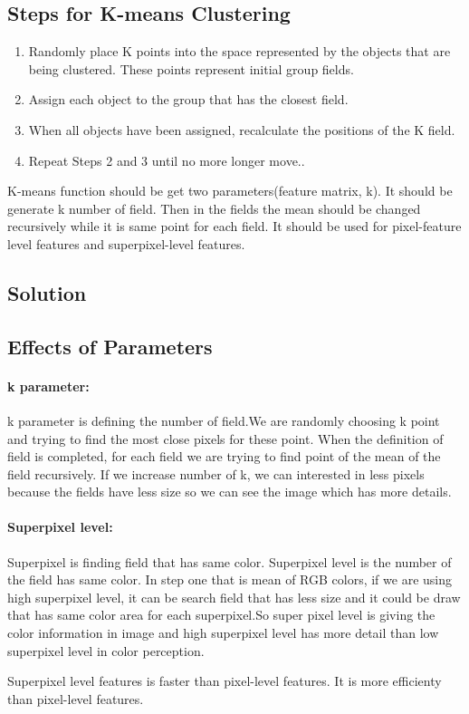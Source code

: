 \documentclass[12pt]{article}
\begin{document}
\subsection*{Steps for K-means Clustering}
\begin{enumerate}
\item Randomly place K points into the space represented by the objects that are being clustered. These points represent initial group fields.
\item Assign each object to the group that has the closest field.
\item When all objects have been assigned, recalculate the positions of the K field.
\item Repeat Steps 2 and 3 until no more longer move..
\end{enumerate}
K-means function should be get two parameters(feature matrix, k). It should be generate k number of field. Then in the fields the mean should be changed recursively while it is same point for each field. It should be used for pixel-feature level features and superpixel-level features.
\subsection{Solution}

\subsection{Effects of Parameters}
\paragraph{k parameter:} k parameter is defining the number of field.We are randomly choosing k point and trying to find the most close pixels for these point. When the definition of field is completed, for each field we are trying to find point of the mean of the field recursively. If we increase number of k, we can interested in less pixels because the fields have less size so we can see the image which has more details.

\paragraph{Superpixel level:} Superpixel is finding field that has same color. Superpixel level is the number of the field has same color. In step one that is mean of RGB colors, if we are using high superpixel level, it can be search field that has less size and it could be draw that has same color area for each superpixel.So super pixel level is giving the color information in image and high superpixel level has more detail than low superpixel level in color perception.

Superpixel level features is faster than pixel-level features. It is more efficienty than pixel-level features.           
\end{document}

